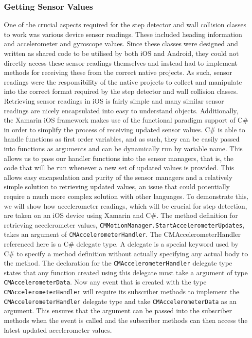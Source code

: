\documentclass[12pt,a4paper]{report}
\begin{document}
\subsubsection{Getting Sensor Values}
One of the crucial aspects required for the step detector and wall collision classes to work was various device sensor readings. These included heading information and accelerometer and gyroscope values. Since these classes were designed and written as shared code to be utilised by both iOS and Android, they could not directly access these sensor readings themselves and instead had to implement methods for receiving these from the correct native projects. As such, sensor readings were the responsibility of the native projects to collect and manipulate into the correct format required by the step detector and wall collision classes. Retrieving sensor readings in iOS is fairly simple and many similar sensor readings are nicely encapsulated into easy to understand objects. Additionally, the Xamarin iOS framework makes use of the functional paradigm support of C\# in order to simplify the process of receiving updated sensor values. C\# is able to handle functions as first order variables, and as such, they can be easily passed into functions as arguments and can be dynamically run by variable name. This allows us to pass our handler functions into the sensor managers, that is, the code that will be run whenever a new set of updated values is provided. This allows easy encapsulation and purity of the sensor managers and a relatively simple solution to retrieving updated values, an issue that could potentially require a much more complex solution with other languages. To demonstrate this, we will show how accelerometer readings, which will be crucial for step detection, are taken on an iOS device using Xamarin and C\#. The method definition for retrieving accelerometer values, \texttt{CMMotionManager.StartAccelerometerUpdates}, takes an argument of \texttt{CMAccelerometerHandler}. The CMAccelerometerHandler referenced here is a C\# delegate type. A delegate is a special keyword used by C\# to specify a method definition without actually specifying any actual body to the method. The declaration for the \texttt{CMAccelerometerHandler} delegate type states that any function created using this delegate must take a argument of type \texttt{CMAccelerometerData}. Now any event that is created with the type \texttt{CMAccelerometerHandler} will require its subscriber methods to implement the \texttt{CMAccelerometerHandler} delegate type and take \texttt{CMAccelerometerData} as an argument. This ensures that the argument can be passed into the subscriber methods when the event is called and the subscriber methods can then access the latest updated accelerometer values. 
\end{document}
